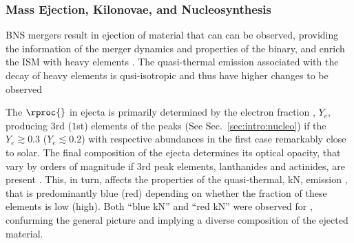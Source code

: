 

\subsubsection{Mass Ejection, Kilonovae, and Nucleosynthesis}

\ac{BNS} mergers result in ejection of material that can can be observed, providing the 
information of the merger dynamics and properties of the binary, and enrich the 
\ac{ISM} with heavy \rproc{} elements \cite{Shibata:2019wef}. The quasi-thermal emission associated with 
the decay of heavy \rproc{} elements is qusi-isotropic and thus have higher changes to be 
observed \cite{Metzger:2019zeh}

The $\rproc{}$ \nuc{} in ejecta is primarily determined by the electron fraction \cite{Lippuner:2015gwa}, $Y_e$, 
producing $3$rd ($1$st) elements of the \rproc{} peaks (See Sec.~\ref{sec:intro:nucleo}) 
if the $Y_e{\gtrsim}0.3$ ($Y_e{\lesssim}0.2$) with respective abundances in the first case 
remarkably close to solar. 
The final composition of the ejecta determines its optical opacity, that vary by orders of 
magnitude if $3$rd peak elements, lanthanides and actinides, are present \cite{Tanaka:2013ana,Kasen:2013xka}.
This, in turn, affects the properties of the quasi-thermal, \ac{kN}, emission \cite{Metzger:2019zeh}, that is 
predominantly blue (red) depending on whether the fraction of these elements is low (high).
Both ``blue \ac{kN}'' and ``red \ac{kN}'' were observed for \GW{}, confurming the general 
picture and implying a diverse composition of the ejected material.


